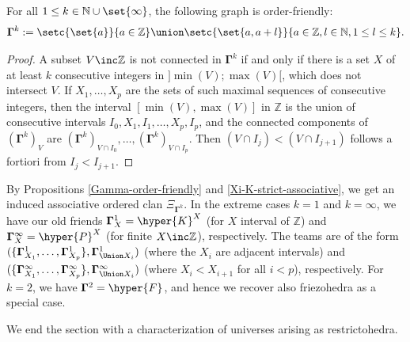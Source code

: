 \begin{proposition} \label{Gamma-order-friendly}
For all   $1\leq k\in \mathbb{N}\cup\set{\infty}$, the following graph is order-friendly:
$$\mathbf{\Gamma}^k:=\setc{\set{a}}{a\in\mathbb{Z}}\union\setc{\set{a,a+l}}{a\in\mathbb{Z},l\in\mathbb{N},1\leq l\leq k}.$$
\end{proposition}
\begin{proof}
A subset $V\inc\mathbb{Z}$ is not connected in  $\mathbf{\Gamma}^k$ if  and only if there is a set $X$ of at least $k$ consecutive integers in $]\min(V);\max(V)[$, which does not intersect $V$.  
If $X_1,\ldots,X_p$ are the sets of such maximal sequences of consecutive integers, then the interval $[\min(V),\max(V)]$ in $\mathbb{Z}$ is the union of consecutive intervals $I_0,X_1,I_1,\ldots,X_p,I_p$, and the connected components of $(\mathbf{\Gamma}^k)_V$ are 
$(\mathbf{\Gamma}^k)_{V\cap I_0},\ldots,(\mathbf{\Gamma}^k)_{V\cap I_p}$. Then $(V\cap I_j)<(V\cap I_{j+1})$ follows a fortiori from $I_j<I_{j+1}$.
\end{proof}
By Propositions \ref{Gamma-order-friendly} and \ref{Xi-K-strict-associative}, we get an induced associative ordered clan $\Xi_{\mathbf{\Gamma}^k}$. 
In the extreme cases $k=1$ and $k=\infty$,  we have our old friends $\mathbf{\Gamma}^1_X=\hyper{K}^X$ (for $X$ interval of $\mathbb{Z}$) and $\mathbf{\Gamma}^\infty_X=\hyper{P}^X$ (for finite $X\inc\mathbb{Z}$), respectively.
The teams are of the form $(\{\mathbf{\Gamma}^1_{X_1},\ldots,\mathbf{\Gamma}^1_{X_p}\},\mathbf{\Gamma}^1_{\Union X_i})$ (where the $X_i$ are adjacent  intervals)  and $(\{\mathbf{\Gamma}^\infty_{X_1},\ldots,\mathbf{\Gamma}^\infty_{X_p}\},\mathbf{\Gamma}^\infty_{\Union X_i})$ (where $X_i<X_{i+1}$ for all $i<p$), respectively.  For $k=2$,
 we have $\mathbf{\Gamma}^2=\hyper{F}$, and hence we recover also friezohedra as a special case.

We end the section with a  characterization of universes arising as restrictohedra.
 
